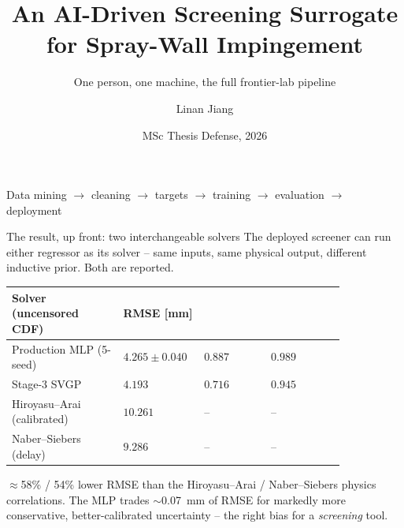 \documentclass[aspectratio=169,11pt]{beamer}
\title[AI Spray-Penetration Surrogate]{An AI-Driven Screening Surrogate for Spray-Wall Impingement}
\subtitle{One person, one machine, the full frontier-lab pipeline}
\author{Linan Jiang}
\institute{Aalto University}
\date{MSc Thesis Defense, 2026}
\newcommand{\good}[1]{\textcolor{goodGreen}{#1}}
\newcommand{\blue}[1]{\textcolor{aaltoBlue}{#1}}
\begin{document}
\begin{frame}
  \titlepage
  \begin{center}\small\blue{Data mining $\to$ cleaning $\to$ targets $\to$ training $\to$ evaluation $\to$ deployment}\end{center}
\end{frame}


\begin{frame}{The result, up front: two interchangeable solvers}
\small
The deployed screener can run \blue{either} regressor as its solver -- same inputs,
same physical output, different inductive prior. Both are reported.
\medskip

\begin{center}
\begin{tabular}{L{0.30\linewidth}R{0.16\linewidth}R{0.18\linewidth}R{0.20\linewidth}}
\toprule
Solver (uncensored CDF) & RMSE [mm] &  &  \\
\midrule
\good{Production MLP} (5-seed) & $4.265 \pm 0.040$ & $0.887$ & $0.989$ \\
\good{Stage-3 SVGP}           & $4.193$           & $0.716$ & $0.945$ \\
\midrule
Hiroyasu--Arai (calibrated)   & $10.261$ & -- & -- \\
Naber--Siebers (delay)        & $9.286$  & -- & -- \\
\bottomrule
\end{tabular}
\end{center}
\medskip

\good{$\approx$58\% / 54\% lower RMSE} than the Hiroyasu--Arai / Naber--Siebers physics
correlations. The MLP trades $\sim$0.07~mm of RMSE for markedly more conservative,
better-calibrated uncertainty -- the right bias for a \emph{screening} tool.
\end{frame}
\end{document}
